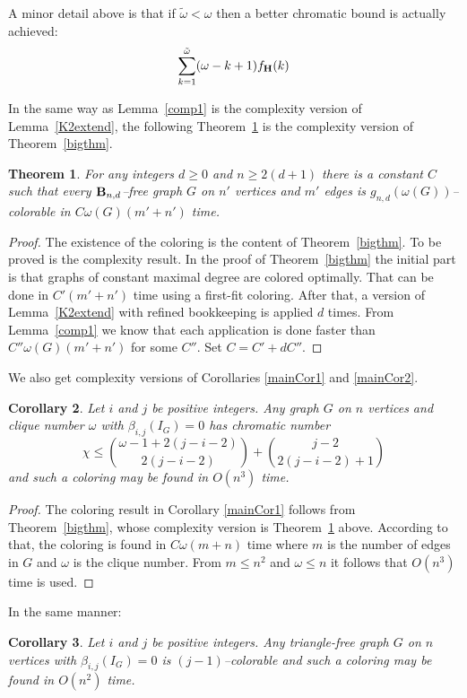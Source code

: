\documentclass{article}
\theoremstyle{plain}
\newtheorem{thm}{Theorem}
\newtheorem{cor}[thm]{Corollary}
\theoremstyle{definition}
\begin{document}
A minor detail above is that if  $\tilde\omega<\omega$ then a better chromatic bound is actually achieved:
\[ \sum_{k=1}^{\tilde \omega}  (\omega-k+1)  f_{{\bf H  } }(k) \]

In the same way as Lemma~\ref{comp1} is the complexity version of Lemma~\ref{K2extend}, the following Theorem~\ref{comp2} is the complexity version of Theorem~\ref{bigthm}.
\begin{thm}\label{comp2}
For any integers $d\geq 0$ and $n\geq 2(d+1)$ there is a constant $C$ such that every ${\bf B}_{n,d}$--free graph $G$ on $n'$ vertices and $m'$ edges is 
$g_{n,d}(\omega(G))$--colorable in $C\omega(G)(m'+n')$ time.
\end{thm}
\begin{proof}
The existence of the coloring is the content of Theorem~\ref{bigthm}. To be proved is the complexity result. In the proof of Theorem~\ref{bigthm} the initial part is that graphs of constant maximal degree are colored optimally. That can be done in $C'(m'+n')$ time using a first-fit coloring. After that, a version of Lemma~\ref{K2extend} with refined bookkeeping is applied $d$ times. From Lemma~\ref{comp1} we know that each application is done faster than $C''\omega(G)(m'+n')$ for some $C''.$ Set $C=C'+dC''.$
\end{proof}

We also get complexity versions of Corollaries \ref{mainCor1} and \ref{mainCor2}.

\begin{cor}\label{n3} Let $i$ and $j$ be positive integers. Any graph $G$ on $n$ vertices and clique number $\omega$ with $\beta_{i,j}(I_G) = 0$ has chromatic number
\[ \chi \leq {\omega-1+2(j-i-2) \choose 2(j-i-2)} +  {j-2 \choose 2(j-i-2)+1} \]
and such a coloring may be found in $O(n^3)$ time. 
\end{cor}
\begin{proof}
The coloring result in Corollary \ref{mainCor1} follows from Theorem~\ref{bigthm}, whose complexity version is Theorem~\ref{comp2} above. According to that, the coloring is found in $C\omega(m+n)$ time where $m$ is the number of edges in $G$ and $\omega$ is the clique number. From $m\leq n^2$ and $\omega\leq n$ it follows that $O(n^3)$ time is used.
\end{proof}
In the same manner:
\begin{cor}\label{n2} Let $i$ and $j$ be positive integers. Any triangle-free graph $G$ on $n$ vertices with $\beta_{i,j}(I_G) = 0$ 
is $(j-1)$--colorable and such a coloring may be found in $O(n^2)$ time.
\end{cor}
\end{document}
